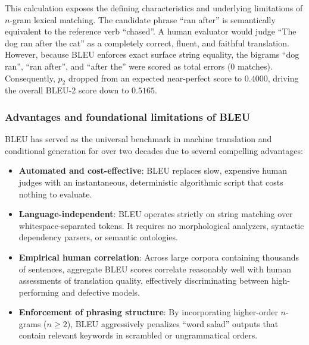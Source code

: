 \documentclass[../../../main.tex]{subfiles}
\begin{document}
This calculation exposes the defining characteristics and underlying limitations of $n$-gram lexical matching. The candidate phrase ``ran after'' is semantically equivalent to the reference verb ``chased''. A human evaluator would judge ``The dog ran after the cat'' as a completely correct, fluent, and faithful translation. However, because BLEU enforces exact surface string equality, the bigrams ``dog ran'', ``ran after'', and ``after the'' were scored as total errors ($0$ matches). Consequently, $p_2$ dropped from an expected near-perfect score to $0.4000$, driving the overall BLEU-2 score down to $0.5165$.

\subsubsection{Advantages and foundational limitations of BLEU}
BLEU has served as the universal benchmark in machine translation and conditional generation for over two decades due to several compelling advantages:
\begin{itemize}
    \item \textbf{Automated and cost-effective}: BLEU replaces slow, expensive human judges with an instantaneous, deterministic algorithmic script that costs nothing to evaluate.
    \item \textbf{Language-independent}: BLEU operates strictly on string matching over whitespace-separated tokens. It requires no morphological analyzers, syntactic dependency parsers, or semantic ontologies.
    \item \textbf{Empirical human correlation}: Across large corpora containing thousands of sentences, aggregate BLEU scores correlate reasonably well with human assessments of translation quality, effectively discriminating between high-performing and defective models.
    \item \textbf{Enforcement of phrasing structure}: By incorporating higher-order $n$-grams ($n \ge 2$), BLEU aggressively penalizes ``word salad'' outputs that contain relevant keywords in scrambled or ungrammatical orders.
\end{itemize}
\end{document}
